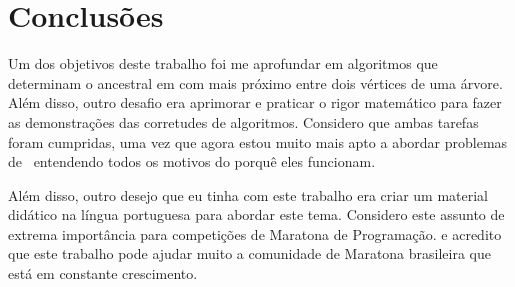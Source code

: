 \chapter{Conclusões}
\label{cap:conclusoes}

Um dos objetivos deste trabalho foi me aprofundar em algoritmos que determinam o ancestral em com mais próximo entre dois vértices de uma árvore. Além disso, outro desafio era aprimorar e praticar o rigor matemático para fazer as demonstrações das corretudes de algoritmos. Considero que ambas tarefas foram cumpridas, uma vez que agora estou muito mais apto a abordar problemas de \LCA\, entendendo todos os motivos do porquê eles funcionam.

Além disso, outro desejo que eu tinha com este trabalho era criar um material didático na língua portuguesa para abordar este tema. Considero este assunto de extrema importância para competições de Maratona de Programação. e acredito que este trabalho pode ajudar muito a comunidade de Maratona brasileira que está em constante crescimento.